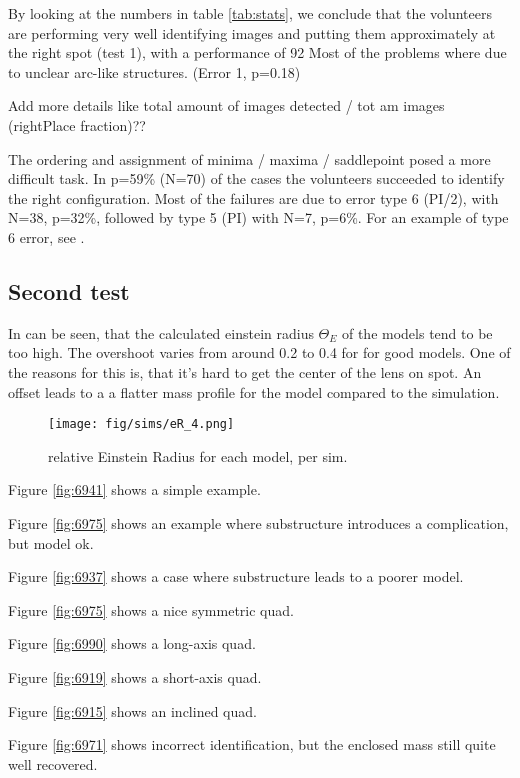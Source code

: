

By looking at the numbers in table \ref{tab:stats}, we conclude that the volunteers are performing very well identifying images and putting them approximately at the right spot (test 1), with a performance of 92%
Most of the problems where due to unclear arc-like structures. (Error 1, p=0.18)

 Add more details like total amount of images detected / tot am images (rightPlace fraction)??

The ordering and assignment of minima / maxima / saddlepoint posed a more difficult task.
In p=59\% (N=70) of the cases the volunteers succeeded to identify the right configuration.
Most of the failures are due to error type 6 (PI/2), with N=38, p=32\%, followed by type 5 (PI) with N=7, p=6\%.
For an example of type 6 error, see .










\subsection{Second test} \label{sec:results.2}

In  can be seen, that the calculated einstein radius $\Theta_E$ of the models tend to be too high.
The overshoot varies from around 0.2 to 0.4 for for good models.
One of the reasons for this is, that it's hard to get the center of the lens on spot.
An offset leads to a a flatter mass profile for the model compared to the simulation.



\begin{figure}[htbp]
  \centering
    \texttt{[image: fig/sims/eR\_4.png]}
  \caption{relative Einstein Radius for each model, per sim. }
  \label{fig:eR_all}
\end{figure}




\hr

Figure \ref{fig:6941} shows a simple example.

Figure \ref{fig:6975} shows an example where substructure introduces a
complication, but model ok.

Figure \ref{fig:6937} shows a case where substructure leads to a
poorer model.

Figure \ref{fig:6975} shows a nice symmetric quad.

Figure \ref{fig:6990} shows a long-axis quad.

Figure \ref{fig:6919} shows a short-axis quad.

Figure \ref{fig:6915} shows an inclined quad.

Figure \ref{fig:6971} shows incorrect identification, but the enclosed
mass still quite well recovered.




\clearpage
